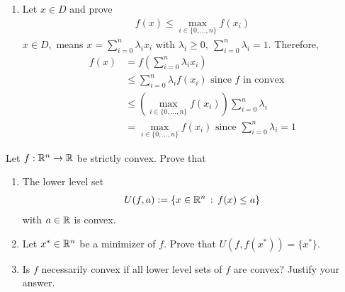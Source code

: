 \documentclass{ExerciseSheet}
\newif\ifsolutions
\begin{document}
\begin{solution}
\begin{enumerate}
    \item Let $x\in D$ and prove 
       \begin{align*}
           f(x)\leq \max_{i\in \{0,\dots,n\}}f(x_i)
       \end{align*}
 $x\in D,$ means $\displaystyle x=\sum_{i=0}^{n}\lambda_ix_i$ with $\displaystyle \lambda_i\geq 0,~\sum_{i=0}^{n}\lambda_i=1.$ Therefore,
   \begin{align*}
       f(x)&=f\left(\sum_{i=0}^{n}\lambda_ix_i\right)  \\
           &\leq \sum_{i=0}^{n}\lambda_if(x_i)  \text{ since $f$ in convex}\\
           &\leq  \left(\max_{i\in \{0,\dots,n\}}f(x_i)\right)\sum_{i=0}^{n}\lambda_i \\
           &=\max_{i\in \{0,\dots,n\}}f(x_i)  \text{ since $\sum_{i=0}^{n}\lambda_i=1$}
   \end{align*}





       
\end{enumerate}
\end{solution}

\fi

\vskip 0.5cm
\begin{problem}

  
 Let $f:\mathbb{R}^n\rightarrow\mathbb{R}$ be strictly convex. Prove that
 \begin{enumerate}
  \item The lower level set 
  \begin{align*}
   U(f,a):=\{x \in\mathbb{R}^n\,:\,f(x)\leq a\}
  \end{align*}
with $a\in\mathbb{R}$ is convex.
\item Let $x^*\in\mathbb{R}^n$ be a minimizer of $f$. Prove that $U(f,f(x^*))=\{x^*\}$. 
\item Is $f$ necessarily convex if all lower level sets of $f$ are convex? Justify your answer.
 \end{enumerate}
 


\end{problem}

\ifsolutions
\vskip 0.3cm
\end{document}
